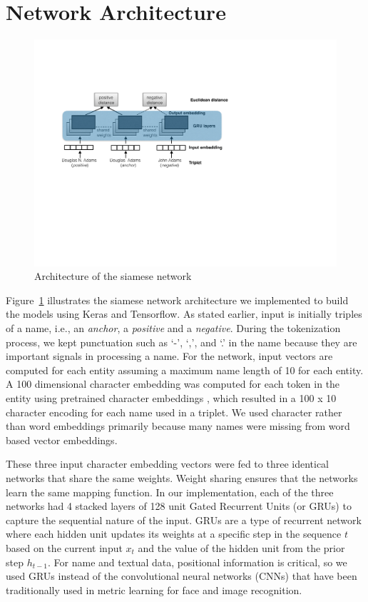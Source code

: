 \section{Network Architecture}
\label{architecture}
\begin{figure}
\includegraphics[width=0.8\linewidth]{triplet_siamese_network}
\caption{Architecture of the siamese network}
\label{siamese_nets}
\end{figure}

Figure~\ref{siamese_nets} illustrates the siamese network architecture \cite{DBLP:conf/cvpr/SchroffKP15} we implemented to build the models using Keras and Tensorflow.  As stated earlier, input is initially triples of a name, i.e., an \textit{anchor}, a \textit{positive} and a \textit{negative}.  During the tokenization process, we kept punctuation such as `-', `,', and `.' in the name because they are important signals in processing a name.  For the network, input vectors are computed for each entity assuming a maximum name length of 10 for each entity.  A 100 dimensional character embedding was computed for each token in the entity using pretrained character embeddings \cite{hashimoto-jmt:2017:EMNLP2017}, which resulted in a 100 x 10 character encoding for each name used in a triplet.  We used character rather than word embeddings primarily because many names were missing from word based vector embeddings.

These three input character embedding vectors were fed to three identical networks that share the same weights.  Weight sharing ensures that the networks learn the same mapping function.  In our implementation, each of the three networks had 4 stacked layers of 128 unit Gated Recurrent Units (or GRUs) to capture the sequential nature of the input.  GRUs are a type of recurrent network \cite{cho-al-emnlp14} where each hidden unit updates its weights at a specific step in the sequence $t$ based on the current input $x_t$ and the value of the hidden unit from the prior step $h_{t-1}$.  For name and textual data, positional information is critical, so we used GRUs instead of the convolutional neural networks (CNNs) that have been traditionally used in metric learning for face and image recognition. 

